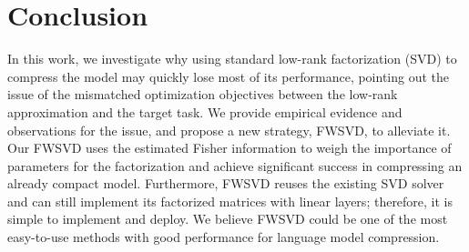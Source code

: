 \section{Conclusion}

In this work, we investigate why using standard low-rank factorization (SVD) to compress the model may quickly lose most of its performance, pointing out the issue of the mismatched optimization objectives between the low-rank approximation and the target task. We provide empirical evidence and observations for the issue, and propose a new strategy, FWSVD, to alleviate it. Our FWSVD uses the estimated Fisher information to weigh the importance of parameters for the factorization and achieve significant success in compressing an already compact model. Furthermore, FWSVD reuses the existing SVD solver and can still implement its factorized matrices with linear layers; therefore, it is simple to implement and deploy. We believe FWSVD could be one of the most easy-to-use methods with good performance for language model compression.